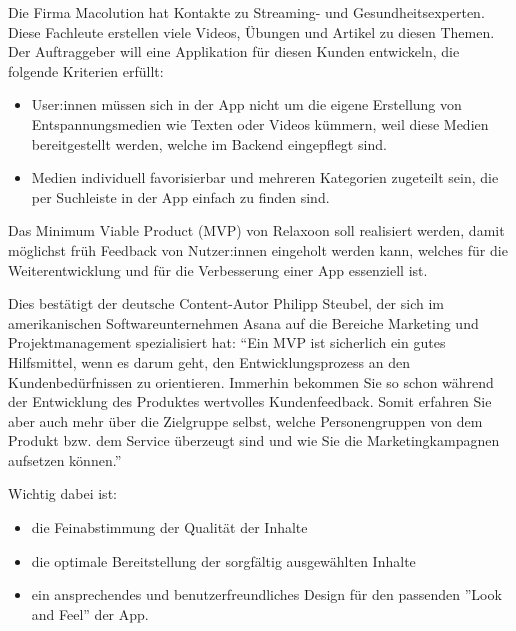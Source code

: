 
Die Firma Macolution hat Kontakte zu Streaming- und Gesundheitsexperten. Diese Fachleute erstellen viele Videos, 
Übungen und Artikel zu diesen Themen. Der Auftraggeber will eine Applikation für diesen Kunden entwickeln, die folgende
Kriterien erfüllt:

\begin{itemize}
    \item User:innen müssen sich in der App nicht um die eigene Erstellung von Entspannungsmedien wie Texten oder Videos
    kümmern, weil diese Medien bereitgestellt werden, welche im Backend eingepflegt sind.
    \item Medien
    individuell favorisierbar und mehreren Kategorien zugeteilt sein, die per Suchleiste in der App einfach zu
    finden sind.
\end{itemize}

Das Minimum Viable Product (MVP) von Relaxoon soll realisiert werden, damit möglichst früh Feedback von Nutzer:innen
eingeholt werden kann, welches für die Weiterentwicklung und für die Verbesserung einer App essenziell ist.

Dies bestätigt der deutsche Content-Autor Philipp Steubel, der sich im amerikanischen Softwareunternehmen Asana
auf die Bereiche Marketing und 
Projektmanagement spezialisiert hat: "`Ein MVP ist sicherlich ein gutes Hilfsmittel, wenn es darum geht, den 
Entwicklungsprozess an den Kundenbedürfnissen zu orientieren. Immerhin bekommen Sie so schon während der 
Entwicklung des Produktes wertvolles Kundenfeedback. Somit erfahren Sie aber auch mehr über die Zielgruppe 
selbst, welche Personengruppen von dem Produkt bzw. dem Service überzeugt sind und wie Sie die Marketingkampagnen
aufsetzen können."' \cite{mvp}





Wichtig dabei ist: 

\begin{itemize}
    \item die Feinabstimmung der Qualität der Inhalte
    \item die optimale Bereitstellung der sorgfältig ausgewählten Inhalte
    \item ein ansprechendes und benutzerfreundliches Design für den passenden ''Look and Feel'' der App.
\end{itemize}